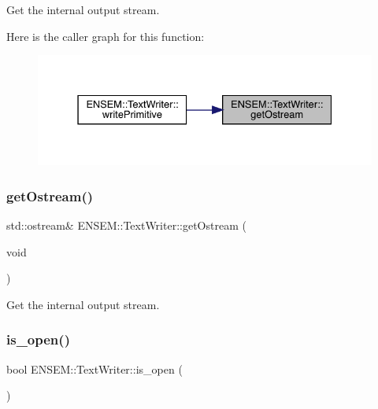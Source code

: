 Get the internal output stream. 

Here is the caller graph for this function\+:\nopagebreak
\begin{figure}[H]
\begin{center}
\leavevmode
\includegraphics[width=331pt]{db/d53/classENSEM_1_1TextWriter_a40ade2e6c44ba267efdce5fb70909362_icgraph}
\end{center}
\end{figure}
\mbox{\label{classENSEM_1_1TextWriter_a40ade2e6c44ba267efdce5fb70909362}} 
\subsubsection{\texorpdfstring{getOstream()}{getOstream()}\hspace{0.1cm}{\footnotesize\ttfamily [2/2]}}
{\footnotesize\ttfamily std\+::ostream\& E\+N\+S\+E\+M\+::\+Text\+Writer\+::get\+Ostream (\begin{DoxyParamCaption}\item[{void}]{ }\end{DoxyParamCaption})\hspace{0.3cm}{\ttfamily [inline]}}



Get the internal output stream. 

\mbox{\label{classENSEM_1_1TextWriter_a6718d81018fe6a709f11cdb2f008c68b}} 
\subsubsection{\texorpdfstring{is\_open()}{is\_open()}\hspace{0.1cm}{\footnotesize\ttfamily [1/2]}}
{\footnotesize\ttfamily bool E\+N\+S\+E\+M\+::\+Text\+Writer\+::is\+\_\+open (\begin{DoxyParamCaption}{ }\end{DoxyParamCaption})}



